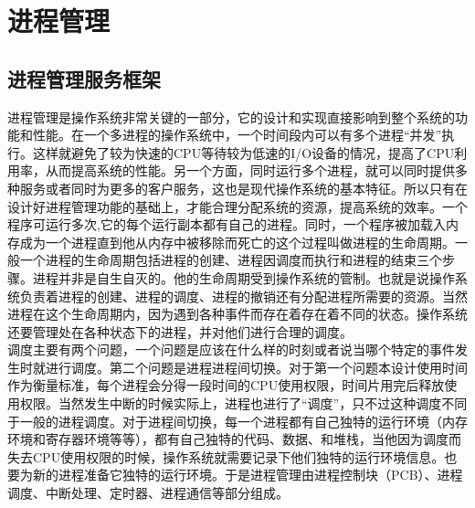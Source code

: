 \documentclass[UTF8,nofonts,cs4size]{ctexrep}
\begin{document}
\chapter{进程管理}
\section{进程管理服务框架}
进程管理是操作系统非常关键的一部分，它的设计和实现直接影响到整个系统的功能和性能。在一个多进程的操作系统中，一个时间段内可以有多个进程“并发”执行。这样就避免了较为快速的CPU等待较为低速的I/O设备的情况，提高了CPU利用率，从而提高系统的性能。另一个方面，同时运行多个进程，就可以同时提供多种服务或者同时为更多的客户服务，这也是现代操作系统的基本特征。所以只有在设计好进程管理功能的基础上，才能合理分配系统的资源，提高系统的效率。一个程序可运行多次,它的每个运行副本都有自己的进程。同时，一个程序被加载入内存成为一个进程直到他从内存中被移除而死亡的这个过程叫做进程的生命周期。一般一个进程的生命周期包括进程的创建、进程因调度而执行和进程的结束三个步骤。进程并非是自生自灭的。他的生命周期受到操作系统的管制。也就是说操作系统负责着进程的创建、进程的调度、进程的撤销还有分配进程所需要的资源。当然进程在这个生命周期内，因为遇到各种事件而存在着存在着不同的状态。操作系统还要管理处在各种状态下的进程，并对他们进行合理的调度。
\\
\indent 
调度主要有两个问题，一个问题是应该在什么样的时刻或者说当哪个特定的事件发生时就进行调度。第二个问题是进程进程间切换。对于第一个问题本设计使用时间作为衡量标准，每个进程会分得一段时间的CPU使用权限，时间片用完后释放使用权限。当然发生中断的时候实际上，进程也进行了“调度”，只不过这种调度不同于一般的进程调度。对于进程间切换，每一个进程都有自己独特的运行环境（内存环境和寄存器环境等等），都有自己独特的代码、数据、和堆栈，当他因为调度而失去CPU使用权限的时候，操作系统就需要记录下他们独特的运行环境信息。也要为新的进程准备它独特的运行环境。于是进程管理由进程控制块（PCB）、进程调度、中断处理、定时器、进程通信等部分组成。
\end{document}
